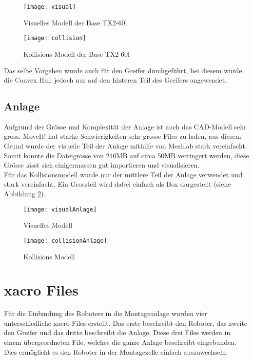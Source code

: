 \begin{figure} []
	\begin{minipage}[h]{0,49\textwidth}
		\centering
			\texttt{[image: visual]}
		\caption{Visuelles Modell der Base TX2-60l}
		\label{fig:visual}
	\end{minipage}
	\begin{minipage}[h]{0,49\textwidth}
		\centering
			\texttt{[image: collision]}
		\caption{Kollisions Modell der Base TX2-60l}
		\label{fig:Collision}
	\end{minipage}
\end{figure}
Das selbe Vorgehen wurde auch für den Greifer durchgeführt, bei diesem wurde die Convex Hull jedoch nur auf den hinteren Teil des Greifers angewendet.  

\subsection{Anlage}
Aufgrund der Grösse und Komplexität der Anlage ist auch das CAD-Modell sehr gross. MoveIt! hat starke Schwierigkeiten sehr grosse Files zu laden, aus diesem  Grund wurde der visuelle Teil der Anlage mithilfe von Meshlab stark vereinfacht. Somit konnte die Dateigrösse von 240MB auf circa 50MB verringert werden, diese Grösse lässt sich einigermassen gut importieren und visualisieren.\\
Für das Kollisionsmodell wurde nur der mittlere Teil der Anlage verwendet und stark vereinfacht. Ein Grossteil wird dabei einfach als Box dargestellt (siehe Abbildung \ref{fig:collisionAnlage}).

\begin{figure} [H]
	\begin{minipage}[h]{0,49\textwidth}
		\centering
		\texttt{[image: visualAnlage]}
		\caption{Visuelles Modell}
		\label{fig:visualAnlage}
	\end{minipage}
	\begin{minipage}[h]{0,49\textwidth}
		\centering
		\texttt{[image: collisionAnlage]}
		\caption{Kollisions Modell}
		\label{fig:collisionAnlage}
	\end{minipage}
\end{figure}

\section{xacro Files}
Für die Einbindung des Roboters in die Montageanlage wurden vier unterschiedliche xacro-Files erstellt. Das erste beschreibt den Roboter, das zweite den Greifer und das dritte beschreibt die Anlage. Diese drei Files werden in einem übergeordneten File, welches die ganze Anlage beschreibt eingebunden. Dies ermöglicht es den Roboter in der Montagezelle einfach auszuwechseln. 
